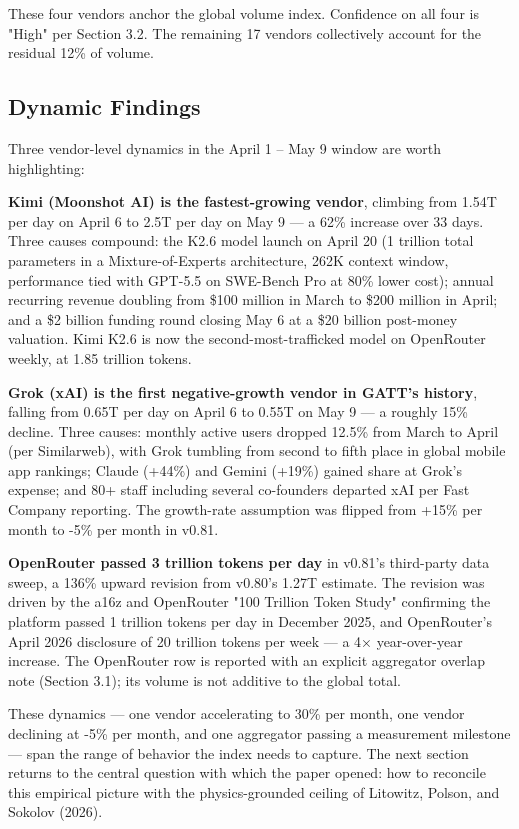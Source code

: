 \documentclass[11pt,a4paper]{article}
\begin{document}
These four vendors anchor the global volume index. Confidence on all four is "High" per Section 3.2. The remaining 17 vendors collectively account for the residual 12\% of volume.

\subsection{Dynamic Findings}

Three vendor-level dynamics in the April 1 – May 9 window are worth highlighting:

\textbf{Kimi (Moonshot AI) is the fastest-growing vendor}, climbing from 1.54T per day on April 6 to 2.5T per day on May 9 --- a 62\% increase over 33 days. Three causes compound: the K2.6 model launch on April 20 (1 trillion total parameters in a Mixture-of-Experts architecture, 262K context window, performance tied with GPT-5.5 on SWE-Bench Pro at 80\% lower cost); annual recurring revenue doubling from \$100 million in March to \$200 million in April; and a \$2 billion funding round closing May 6 at a \$20 billion post-money valuation. Kimi K2.6 is now the second-most-trafficked model on OpenRouter weekly, at 1.85 trillion tokens.

\textbf{Grok (xAI) is the first negative-growth vendor in GATT's history}, falling from 0.65T per day on April 6 to 0.55T on May 9 --- a roughly 15\% decline. Three causes: monthly active users dropped 12.5\% from March to April (per Similarweb), with Grok tumbling from second to fifth place in global mobile app rankings; Claude (+44\%) and Gemini (+19\%) gained share at Grok's expense; and 80+ staff including several co-founders departed xAI per Fast Company reporting. The growth-rate assumption was flipped from +15\% per month to -5\% per month in v0.81.

\textbf{OpenRouter passed 3 trillion tokens per day} in v0.81's third-party data sweep, a 136\% upward revision from v0.80's 1.27T estimate. The revision was driven by the a16z and OpenRouter "100 Trillion Token Study" \cite{aubakirova2026state} confirming the platform passed 1 trillion tokens per day in December 2025, and OpenRouter's April 2026 disclosure of 20 trillion tokens per week --- a 4× year-over-year increase. The OpenRouter row is reported with an explicit aggregator overlap note (Section 3.1); its volume is not additive to the global total.

These dynamics --- one vendor accelerating to 30\% per month, one vendor declining at -5\% per month, and one aggregator passing a measurement milestone --- span the range of behavior the index needs to capture. The next section returns to the central question with which the paper opened: how to reconcile this empirical picture with the physics-grounded ceiling of Litowitz, Polson, and Sokolov (2026).
\end{document}
